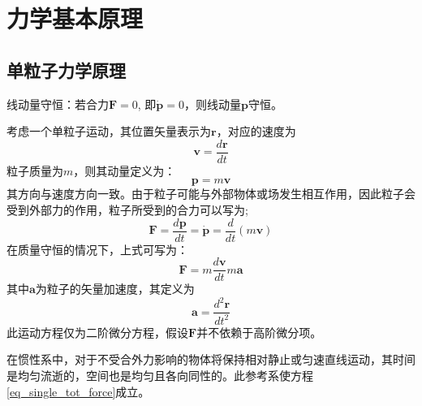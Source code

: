 \chapter{力学基本原理}

\section{单粒子力学原理}
\begin{theorem}[单粒子守恒原理]
	线动量守恒：若合力$\bm{F} = 0$, 即$\bm{\dot{p}} = 0$，则线动量$\bm{p}$守恒。
\end{theorem}
考虑一个单粒子运动，其位置矢量表示为$\bm{r}$，对应的速度为
\begin{equation}
  \bm{v} = \frac{d \bm{r}}{d t} \label{eq_single_velocity}
\end{equation}
粒子质量为$m$，则其动量定义为：
\begin{equation}
  \bm{p} = m \bm{v}   \label{eq_single_momentum}
\end{equation}
其方向与速度方向一致。由于粒子可能与外部物体或场发生相互作用，因此粒子会受到外部力的作用，粒子所受到的合力可以写为;
\begin{equation}
  \bm{F} = \frac{d \bm{p}}{dt} = \dot{\bm{p}} = \frac{d }{dt}(m\bm{v})  \label{eq_single_tot_force}
\end{equation}
在质量守恒的情况下，上式可写为：
\begin{equation}
  \bm{F} = m \frac{d\bm{v}}{dt} m \bm{a}
\end{equation}
其中$\bm{a}$为粒子的矢量加速度，其定义为
\begin{equation}
	\bm{a} = \frac{d^2 \bm{r}}{dt^2}
\end{equation}
此运动方程仅为二阶微分方程，假设$\bm{F}$并不依赖于高阶微分项。
\begin{definition}
	在惯性系中，对于不受合外力影响的物体将保持相对静止或匀速直线运动，其时间是均匀流逝的，空间也是均匀且各向同性的。此参考系使方程\eqref{eq_single_tot_force}成立。
\end{definition}


